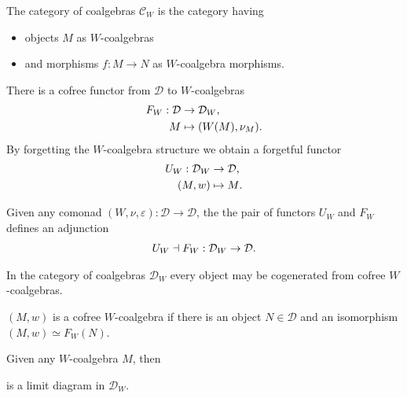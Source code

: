 \documentclass[../thesis.tex]{subfiles}
\begin{document}
    \begin{definition}
        The category of coalgebras $\mathcal{C}_W$ is the category having
        \begin{itemize}
            \item objects $M$ as $W$-coalgebras
            \item and morphisms $f : M \rightarrow N$ as $W$-coalgebra morphisms.
        \end{itemize}
    \end{definition}

    There is a cofree functor from $\mathcal{D}$ to $W$-coalgebras
    \begin{align*}
        F_W : \mathcal{D} & \rightarrow \mathcal{D}_W\tt{,} \\
        M & \mapsto (W(M),\nu_M)\tt{.}
    \end{align*}
    By forgetting the $W$-coalgebra structure we obtain a forgetful functor
    \begin{align*}
        U_W : \mathcal{D}_W & \rightarrow \mathcal{D}\tt{,} \\
        (M, w) & \mapsto M\tt{.}
    \end{align*}
    \begin{lemma}
        Given any comonad $(W, \nu, \varepsilon) : \mathcal{D} \rightarrow \mathcal{D}$, the the pair of functors $U_W$ and $F_W$ defines an adjunction
        \begin{align*}
            U_W \dashv F_W : \mathcal{D}_W \rightarrow \mathcal{D}\tt{.}
        \end{align*} 
    \end{lemma}

    In the category of coalgebras $\mathcal{D}_W$ every object may be cogenerated from cofree $W$-coalgebras.
    \begin{definition}
        $(M,w)$ is a cofree $W$-coalgebra if there is an object $N \in \mathcal{D}$ and an isomorphism $(M,w) \simeq F_W(N)$.
    \end{definition}
    \begin{proposition}
        Given any $W$-coalgebra $M$, then
        \begin{center}
        \end{center}
        is a limit diagram in $\mathcal{D}_W$.
    \end{proposition}
\end{document}
